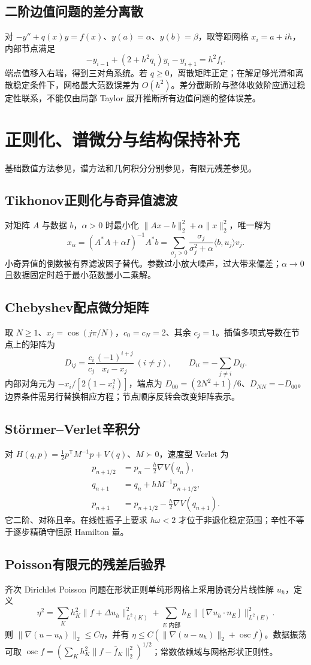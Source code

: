 \documentclass[../main.tex]{subfiles}
\begin{document}
\subsection{二阶边值问题的差分离散}
对 $-y''+q(x)y=f(x)$、$y(a)=\alpha$、$y(b)=\beta$，取等距网格 $x_i=a+ih$，内部节点满足
\[
-y_{i-1}+(2+h^2q_i)y_i-y_{i+1}=h^2f_i.
\]
端点值移入右端，得到三对角系统。若 $q\ge0$，离散矩阵正定；在解足够光滑和离散稳定条件下，网格最大范数误差为 $O(h^2)$。差分截断阶与整体收敛阶应通过稳定性联系，不能仅由局部 Taylor 展开推断所有边值问题的整体误差。
\section{正则化、谱微分与结构保持补充}
基础数值方法参见\cite{fnc}，谱方法和几何积分分别参见\cite{spectral,geometric}，有限元残差参见\cite{fem}。
\subsection{Tikhonov正则化与奇异值滤波}
对矩阵 $A$ 与数据 $b$，$\alpha>0$ 时最小化 $\|Ax-b\|_2^2+\alpha\|x\|_2^2$，唯一解为
\[
x_\alpha=(A^*A+\alpha I)^{-1}A^*b
=\sum_{\sigma_j>0}\frac{\sigma_j}{\sigma_j^2+\alpha}
\langle b,u_j\rangle v_j.
\]
小奇异值的倒数被有界滤波因子替代。参数过小放大噪声，过大带来偏差；$\alpha\to0$ 且数据固定时趋于最小范数最小二乘解。
\subsection{Chebyshev配点微分矩阵}
取 $N\ge1$、$x_j=\cos(j\pi/N)$，$c_0=c_N=2$、其余 $c_j=1$。插值多项式导数在节点上的矩阵为
\[
D_{ij}=\frac{c_i}{c_j}\frac{(-1)^{i+j}}{x_i-x_j}\ (i\ne j),\qquad
D_{ii}=-\sum_{j\ne i}D_{ij}.
\]
内部对角元为 $-x_i/[2(1-x_i^2)]$，端点为 $D_{00}=(2N^2+1)/6$、$D_{NN}=-D_{00}$。边界条件需另行替换相应方程；节点顺序反转会改变矩阵表示。
\subsection{Störmer--Verlet辛积分}
对 $H(q,p)=\tfrac12p^{\mathsf T}M^{-1}p+V(q)$、$M\succ0$，速度型 Verlet 为
\begin{align*}
p_{n+1/2}&=p_n-\tfrac h2\nabla V(q_n),\\
q_{n+1}&=q_n+hM^{-1}p_{n+1/2},\\
p_{n+1}&=p_{n+1/2}-\tfrac h2\nabla V(q_{n+1}).
\end{align*}
它二阶、对称且辛。在线性振子上要求 $h\omega<2$ 才位于非退化稳定范围；辛性不等于逐步精确守恒原 Hamilton 量。
\subsection{Poisson有限元的残差后验界}
齐次 Dirichlet Poisson 问题在形状正则单纯形网格上采用协调分片线性解 $u_h$，定义
\[
\eta^2=\sum_Kh_K^2\|f+\Delta u_h\|_{L^2(K)}^2
+\sum_{E\text{ 内部}}h_E\|[\nabla u_h\cdot n_E]\|_{L^2(E)}^2.
\]
则 $\|\nabla(u-u_h)\|_2\le C\eta$，并有 $\eta\le C(\|\nabla(u-u_h)\|_2+\operatorname{osc}f)$。数据振荡可取 $\operatorname{osc}f=(\sum_Kh_K^2\|f-\bar f_K\|_2^2)^{1/2}$；常数依赖域与网格形状正则性。
\clearpage
\end{document}
